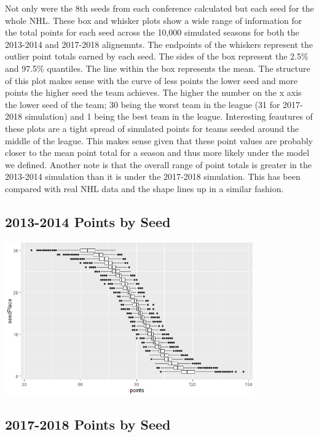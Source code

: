 \documentclass[
]{article}
\begin{document}
Not only were the 8th seeds from each conference calculated but each
seed for the whole NHL. These box and whisker plots show a wide range of
information for the total points for each seed across the 10,000
simulated seasons for both the 2013-2014 and 2017-2018 alignemnts. The
endpoints of the whiskers represent the outlier point totals earned by
each seed. The sides of the box represent the 2.5\% and 97.5\%
quantiles. The line within the box represents the mean. The structure of
this plot makes sense with the curve of less points the lower seed and
more points the higher seed the team achieves. The higher the number on
the x axis the lower seed of the team; 30 being the worst team in the
league (31 for 2017-2018 simulation) and 1 being the best team in the
league. Interesting feautures of these plots are a tight spread of
simulated points for teams seeded around the middle of the league. This
makes sense given that these point values are probably closer to the
mean point total for a season and thus more likely under the model we
defined. Another note is that the overall range of point totals is
greater in the 2013-2014 simulation than it is under the 2017-2018
simulation. This has been compared with real NHL data and the shape
lines up in a similar fashion.

\hypertarget{points-by-seed}{%
\subsection{2013-2014 Points by Seed}\label{points-by-seed}}

\includegraphics[width=0.8\textwidth,height=\textheight]{Images/SeedPlace.png}

\hypertarget{points-by-seed-1}{%
\subsection{2017-2018 Points by Seed}\label{points-by-seed-1}}
\end{document}
